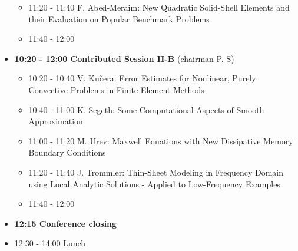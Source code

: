 \documentclass[10pt, A4]{article}%
\begin{document}
\begin{itemize}
\begin{itemize}
    \item 11:20 - 11:40 F. Abed-Meraim: New Quadratic Solid-Shell Elements and their Evaluation on Popular Benchmark Problems
    \item 11:40 - 12:00 
  \end{itemize}
    \item {\bf 10:20 - 12:00 Contributed Session II-B} (chairman P. S) 
  \begin{itemize}
    \item 10:20 - 10:40 V. Ku\v{c}era: Error Estimates for Nonlinear, Purely Convective Problems in Finite Element Methods
    \item 10:40 - 11:00 K. Segeth: Some Computational Aspects of Smooth Approximation
    \item 11:00 - 11:20 M. Urev: Maxwell Equations with New Dissipative Memory Boundary Conditions
    \item 11:20 - 11:40 J. Trommler: Thin-Sheet Modeling in Frequency Domain using Local Analytic Solutions - Applied to Low-Frequency Examples
    \item 11:40 - 12:00  
  \end{itemize}
  \item {\bf 12:15 Conference closing}
  \item 12:30 - 14:00 Lunch
\end{itemize}
\end{document}

